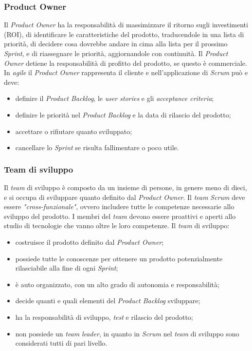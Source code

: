 \subsubsection{Product Owner}
Il \textit{Product Owner} ha la responsabilità di massimizzare il ritorno sugli investimenti (ROI), di identificare le caratteristiche del prodotto, traducendole in una lista di priorità, di decidere cosa dovrebbe andare in cima alla lista per il prossimo \textit{Sprint}, e di riassegnare le priorità, aggiornandole con continuità. Il \textit{Product Owner} detiene la responsabilità di profitto del prodotto, se questo è commerciale. In \textit{agile} il \textit{Product Owner} rappresenta il cliente e nell'applicazione di \textit{Scrum} può e deve:
\begin{itemize}
    \item definire il \textit{Product Backlog}, le \textit{user stories} e gli \textit{acceptance criteria};
    \item definire le priorità nel \textit{Product Backlog} e la data di rilascio del prodotto;
    \item accettare o rifiutare quanto sviluppato;
    \item cancellare lo \textit{Sprint} se risulta fallimentare o poco utile.
\end{itemize}


\subsubsection{Team di sviluppo}
Il \textit{team} di sviluppo è composto da un insieme di persone, in genere meno di dieci, e si occupa di sviluppare quanto definito dal \textit{Product Owner}. Il \textit{team} \textit{Scrum} deve essere \textit{"cross-funzionale"}, ovvero includere tutte le competenze necessarie allo sviluppo del prodotto. I membri del \textit{team} devono essere proattivi e aperti allo studio di tecnologie che vanno oltre le loro competenze.
Il \textit{team} di sviluppo:
\begin{itemize}
    \item costruisce il prodotto definito dal \textit{Product Owner};
    \item possiede tutte le conoscenze per ottenere un prodotto potenzialmente rilasciabile alla fine di ogni \textit{Sprint};
    \item è auto organizzato, con un alto grado di autonomia e responsabilità;
    \item decide quanti e quali elementi del \textit{Product Backlog} sviluppare;
    \item ha la responsabilità di sviluppo, \textit{test} e rilascio del prodotto;
    \item non possiede un \textit{team} \textit{leader}, in quanto in \textit{Scrum} nel \textit{team} di sviluppo sono considerati tutti di pari livello.
\end{itemize}


